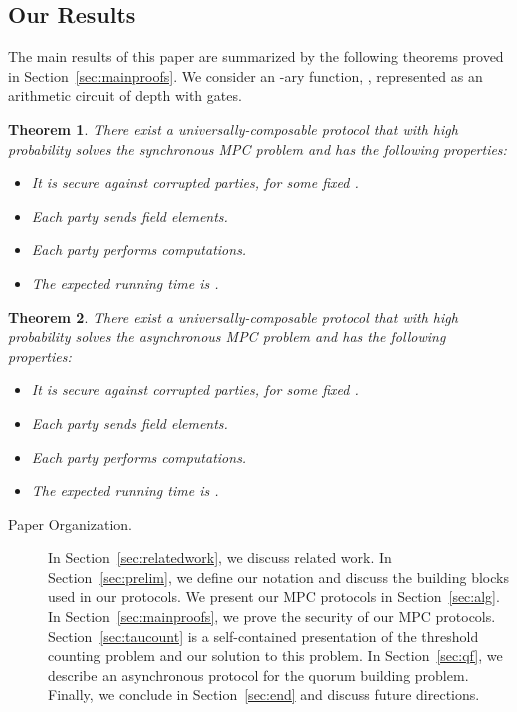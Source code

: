 \documentclass[11pt,letter]{article}
\theoremstyle{mytheoremstyle}
\newtheorem{theorem}{Theorem}
\begin{document}
\subsection{Our Results} \label{sec:results}
The main results of this paper are summarized by the following theorems proved in Section~\ref{sec:mainproofs}. We consider an -ary function, , represented as an arithmetic circuit of depth  with  gates. 

\begin{theorem} \label{thm:main-sync}
	There exist a universally-composable protocol that with high probability solves the synchronous MPC problem and has the following properties:
	\begin{itemize}
		\item It is secure against  corrupted parties, for some fixed .
		\item Each party sends  field elements.
		\item Each party performs  computations.
		\item The expected running time is .
	\end{itemize}
\end{theorem}



\begin{theorem} \label{thm:main}
	There exist a universally-composable protocol that with high probability solves the asynchronous MPC problem and has the following properties:
	\begin{itemize}
		\item It is secure against  corrupted parties, for some fixed .
		\item Each party sends  field elements.
		\item Each party performs  computations.
		\item The expected running time is .
	\end{itemize}
\end{theorem}

\begin{description}
\item[Paper Organization.]
In Section~\ref{sec:relatedwork}, we discuss related work. In Section~\ref{sec:prelim}, we define our notation and discuss the building blocks used in our protocols. We present our MPC protocols in Section~\ref{sec:alg}. In Section~\ref{sec:mainproofs}, we prove the security of our MPC protocols. Section~\ref{sec:taucount} is a self-contained presentation of the threshold counting problem and our solution to this problem. In Section~\ref{sec:qf}, we describe an asynchronous protocol for the quorum building problem. Finally, we conclude in Section~\ref{sec:end} and discuss future directions.
\end{description}
\end{document}
